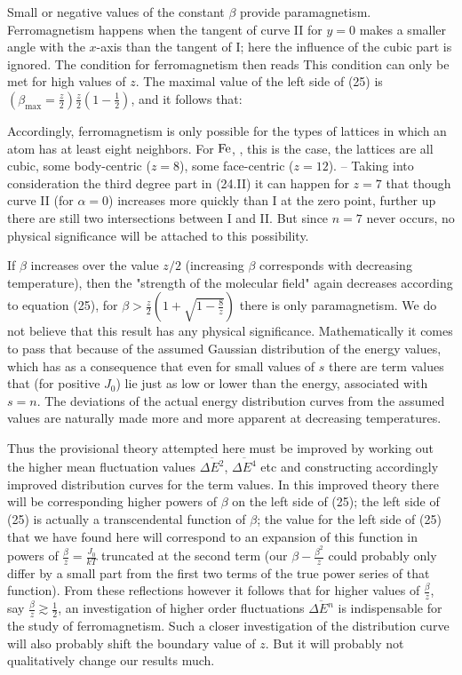 \begin{paper}{1}
Small or negative values of the constant $\beta$ provide paramagnetism. Ferromagnetism happens when the tangent of curve II for $y=0$ makes a smaller angle with the $x$-axis than the tangent of I; here the influence of the cubic part is ignored. The condition for ferromagnetism then reads
This condition can only be met for high values of $z$. The maximal value of the left side of (25) is $\left(\beta_\text{max} = \frac{z}{2}\right)\frac{z}{2}\left(1-\frac{1}{2}\right)$, and it follows that:

Accordingly, ferromagnetism is only possible for the types of lattices in which an atom has at least eight neighbors. For $\text{Fe}$, ,  this is the case, the lattices are all cubic, some body-centric ($z=8$), some face-centric ($z=12$). -- Taking into consideration the third degree part in (24.II) it can happen for $z=7$ that though curve II (for $\alpha=0$) increases more quickly than I at the zero point, further up there are still two intersections between I and II. But since $n=7$ never occurs, no physical significance will be attached to this possibility.

If $\beta$ increases over the value $z/2$ (increasing $\beta$ corresponds with decreasing temperature), then the "strength of the molecular field" again decreases according to equation (25), for $\beta > \frac{z}{2}\left(1+\sqrt{1-\frac{8}{z}}\right)$ there is only paramagnetism. We do not believe that this result has any physical significance. Mathematically it comes to pass that because of the assumed Gaussian distribution of the energy values, which has as a consequence that even for small values of $s$ there are term values that (for positive $J_0$) lie just as low or lower than the energy, associated with $s=n$. The deviations of the actual energy distribution curves from the assumed values are naturally made more and more apparent at decreasing temperatures.

Thus the provisional theory attempted here must be improved by working out the higher mean fluctuation values $\overline{\Delta E^2}$, $\overline{\Delta E^4}$ etc and constructing accordingly improved distribution curves for the term values. In this improved theory there will be corresponding higher powers of $\beta$ on the left side of (25); the left side of (25) is actually a transcendental function of $\beta$; the value for the left side of (25) that we have found here will correspond to an expansion of this function in powers of $\frac{\beta}{z}=\frac{J_0}{kT}$ truncated at the second term (our $\beta-\frac{\beta^2}{z}$ could probably only differ by a small part from the first two terms of the true power series of that function). From these reflections however it follows that for higher values of $\frac{\beta}{z}$, say $\frac{\beta}{z}\gtrsim\frac{1}{2}$, an investigation of higher order fluctuations $\overline{\Delta E^n}$ is indispensable for the study of ferromagnetism. Such a closer investigation of the distribution curve will also probably shift the boundary value of $z$. But it will probably not qualitatively change our results much. 


\end{paper}
